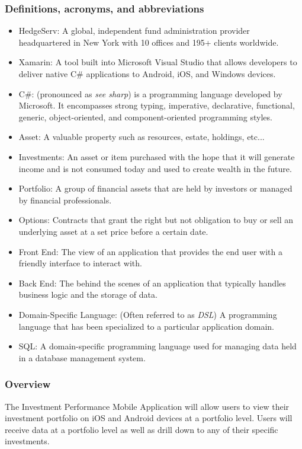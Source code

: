 \documentclass[onecolumn, draftclsnofoot,10pt, compsoc]{IEEEtran}
\begin{document}
\subsubsection{Definitions, acronyms, and abbreviations}
\begin{itemize}
	\item HedgeServ: A global, independent fund administration provider headquartered in New York with
		10 offices and 195+ clients worldwide.
	\item Xamarin: A tool built into Microsoft Visual Studio that allows developers to deliver native 
	   	C\# applications to Android, iOS, and Windows devices.
	\item C\#: (pronounced as \textit{see sharp}) is a programming language developed by Microsoft. It encompasses strong typing, imperative, declarative, functional, generic,
		object-oriented, and component-oriented programming styles.
	\item Asset: A valuable property such as resources, estate, holdings, etc...
	\item Investments: An asset or item purchased with the hope that it will generate income and is not consumed today and used to create wealth in the future.
	\item Portfolio: A group of financial assets that are held by investors or managed by financial professionals.
	\item Options: Contracts that grant the right but not obligation to buy or sell an underlying asset at a set price before a certain date.
	\item Front End: The view of an application that provides the end user with a friendly interface to interact with.
	\item Back End: The behind the scenes of an application that typically handles business logic and the storage of data.
	\item Domain-Specific Language: (Often referred to as \textit{DSL}) A programming language that has been specialized to a particular application domain.
	\item SQL: A domain-specific programming language used for managing data held in a database management system.
\end{itemize}

\subsubsection{Overview}

The Investment Performance Mobile Application will allow users to view their investment portfolio on iOS and Android devices
at a portfolio level. Users will receive data at a portfolio level as well as drill down to any of their specific investments.
\end{document}
